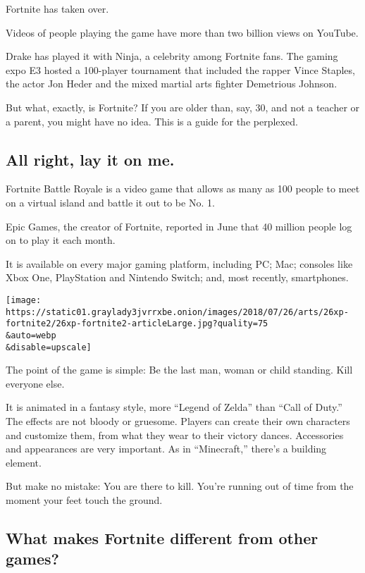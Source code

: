 Fortnite has taken over.

Videos of people playing the game have more than two billion views on
YouTube.

Drake has played it with Ninja, a celebrity among Fortnite fans. The
gaming expo E3 hosted a 100-player tournament that included the rapper
Vince Staples, the actor Jon Heder and the mixed martial arts fighter
Demetrious Johnson.

But what, exactly, is Fortnite? If you are older than, say, 30, and not
a teacher or a parent, you might have no idea. This is a guide for the
perplexed.

\hypertarget{all-right-lay-it-on-me}{%
\subsection{All right, lay it on me.}\label{all-right-lay-it-on-me}}

Fortnite Battle Royale is a video game that allows as many as 100 people
to meet on a virtual island and battle it out to be No. 1.

Epic Games, the creator of Fortnite, reported in June that 40 million
people log on to play it each month.

It is available on every major gaming platform, including PC; Mac;
consoles like Xbox One, PlayStation and Nintendo Switch; and, most
recently, smartphones.

\texttt{[image: https://static01.graylady3jvrrxbe.onion/images/2018/07/26/arts/26xp-fortnite2/26xp-fortnite2-articleLarge.jpg?quality=75\\\&auto=webp\\\&disable=upscale]}

The point of the game is simple: Be the last man, woman or child
standing. Kill everyone else.

It is animated in a fantasy style, more ``Legend of Zelda'' than ``Call
of Duty.'' The effects are not bloody or gruesome. Players can create
their own characters and customize them, from what they wear to their
victory dances. Accessories and appearances are very important. As in
``Minecraft,'' there's a building element.

But make no mistake: You are there to kill. You're running out of time
from the moment your feet touch the ground.

\hypertarget{what-makes-fortnite-different-from-other-games}{%
\subsection{What makes Fortnite different from other
games?}\label{what-makes-fortnite-different-from-other-games}}

